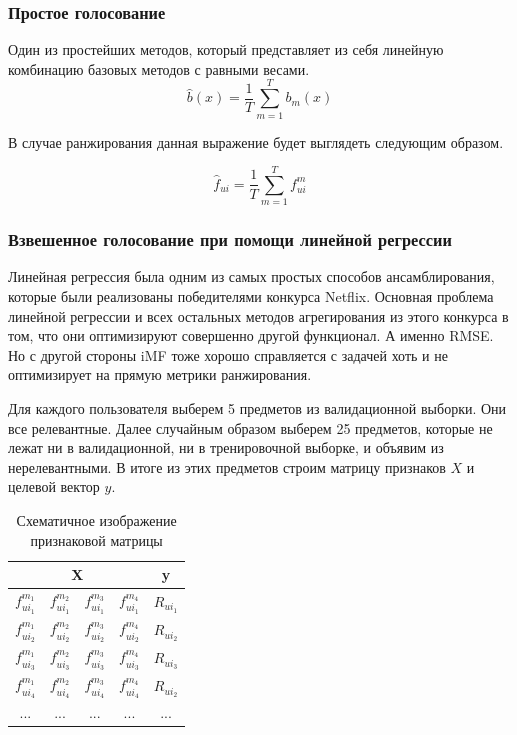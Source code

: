 \documentclass[a4paper,12pt]{article}
\begin{document}
\subsubsection*{Простое голосование}
Один из простейших методов, который представляет из себя линейную комбинацию базовых методов с равными весами.
\begin{equation*}
 	\hat{b}(x)= \frac{1}{T}\sum_{m = 1} ^ T b_m(x)
\end{equation*}

В случае ранжирования данная выражение будет выглядеть следующим образом.

\begin{equation*}
	\hat{f}_{ui} = \frac{1}{T}\sum_{m = 1} ^ T f_{ui}^m
\end{equation*}
\subsubsection*{Взвешенное голосование при помощи линейной регрессии}

Линейная регрессия была одним из самых простых способов ансамблирования, которые были реализованы победителями конкурса Netflix.  Основная  проблема линейной регрессии и всех остальных методов агрегирования из этого конкурса в том, что они оптимизируют совершенно другой функционал. А именно RMSE. Но с другой стороны iMF тоже хорошо справляется с  задачей хоть и не оптимизирует на прямую метрики ранжирования.

Для каждого пользователя  выберем 5 предметов из валидационной выборки. Они все релевантные. Далее случайным образом выберем 25 предметов, которые не лежат ни в валидационной, ни в тренировочной выборке, и объявим из нерелевантными. В итоге из этих предметов строим матрицу признаков $X$ и целевой вектор $y$. 

\begin{table}[H]
\label{tab:schemetable}
\begin{center}
\begin{tabular}{|c|c|c|c|c|}
\hline
 \multicolumn{4}{|c|}{X} & \multicolumn{1}{|c|}{y}\\
\hline
  $f_{ui_1} ^ {m_1}$& $f_{ui_1} ^ {m_2}$ & $f_{ui_1} ^ {m_3}$& $f_{ui_1} ^ {m_4}$& $R_{ui_1}$ \\
\hline
$f_{ui_2} ^ {m_1}$& $f_{ui_2} ^ {m_2}$ & $f_{ui_2} ^ {m_3}$& $f_{ui_2} ^ {m_4}$& $R_{ui_2}$ \\
\hline
$f_{ui_3} ^ {m_1}$& $f_{ui_3} ^ {m_2}$ & $f_{ui_3} ^ {m_3}$& $f_{ui_3} ^ {m_4}$& $R_{ui_3}$ \\
\hline
$f_{ui_4} ^ {m_1}$& $f_{ui_4} ^ {m_2}$ & $f_{ui_4} ^ {m_3}$& $f_{ui_4} ^ {m_4}$& $R_{ui_2}$ \\
\hline
... & ... & ... &  ... & ... \\
\end{tabular}
\end{center}
\caption{Схематичное изображение признаковой матрицы}
\end{table} 
\end{document}
